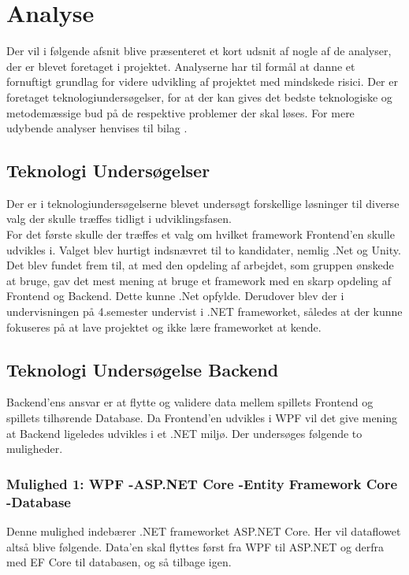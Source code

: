 \section{Analyse}
Der vil i følgende afsnit blive præsenteret et kort udsnit af nogle af de analyser, der er blevet foretaget i projektet. Analyserne har til formål at danne et fornuftigt grundlag for videre udvikling af
projektet med mindskede risici. Der er foretaget teknologiundersøgelser, for at der kan gives det bedste teknologiske og metodemæssige bud på de respektive problemer der skal løses. For mere udybende analyser henvises til bilag \parencite[][section 8]{TekniskBilag}.

\subsection{Teknologi Undersøgelser}
Der er i teknologiundersøgelserne blevet undersøgt forskellige løsninger til diverse valg der skulle træffes tidligt i udviklingsfasen.\\
For det første skulle der træffes et valg om hvilket framework Frontend'en skulle udvikles i. Valget blev hurtigt indsnævret til to kandidater, nemlig .Net og Unity. Det blev fundet frem til, at med den 
opdeling af arbejdet, som gruppen ønskede at bruge, gav det mest mening at bruge et framework med en skarp opdeling af Frontend og Backend. 
Dette kunne .Net opfylde. Derudover blev der i undervisningen på 4.semester undervist i .NET frameworket, således at der kunne fokuseres på at lave projektet og ikke lære frameworket at kende. 


\subsection{Teknologi Undersøgelse Backend}
Backend’ens ansvar er at flytte og validere data mellem spillets Frontend og spillets tilhørende Database. Da Frontend'en udvikles i WPF vil det give mening at Backend ligeledes udvikles i et .NET miljø.
Der undersøges følgende to muligheder.\\

\subsubsection{Mulighed 1: WPF -\g ASP.NET Core -\g Entity Framework Core -\g Database}
Denne mulighed indebærer .NET frameworket ASP.NET Core. Her vil dataflowet altså blive følgende. Data’en skal flyttes først fra WPF til ASP.NET og derfra med EF Core\cite{Entity-Framework-Core} til databasen, og så tilbage igen.


